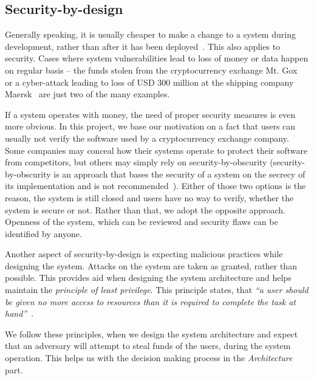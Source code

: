 \subsection{Security-by-design}

Generally speaking, it is usually cheaper to make a change to a system during development, rather than after it has been deployed~\cite[p. 9]{Sommerville2011SoftwareEngineering}. This also applies to security. Cases where system vulnerabilities lead to loss of money or data happen on regular basis -- the funds stolen from the cryptocurrency exchange Mt. Gox~\cite{Popper2014ApparentTimes} or a cyber-attack leading to loss of USD 300 million at the shipping company Maersk~\cite{JordanNovet2017MaerskMillion} are just two of the many examples.

If a system operates with money, the need of proper security measures is even more obvious. In this project, we base our motivation on a fact that users can usually not verify the software used by a cryptocurrency exchange company. Some companies may conceal how their systems operate to protect their software from competitors, but others may simply rely on security-by-obscurity (security-by-obscurity is an approach that bases the security of a system on the secrecy of its implementation and is not recommended~\cite{Scarfone2008GuideTechnology}). Either of those two options is the reason, the system is still closed and users have no way to verify, whether the system is secure or not. Rather than that, we adopt the opposite approach. Openness of the system, which can be reviewed and security flaws can be identified by anyone.

Another aspect of security-by-design is expecting malicious practices while designing the system. Attacks on the system are taken as granted, rather than possible. This provides aid when designing the system architecture and helps maintain the \textit{principle of least privilege}. This principle states, that \textit{``a user should be given no more access to resources than it is required to complete the task at hand''}~\cite{XiaopuSpecifyingControl}. 

We follow these principles, when we design the system architecture and expect that an adversary will attempt to steal funds of the users, during the system operation. This helps us with the decision making process in the \textit{Architecture} part.